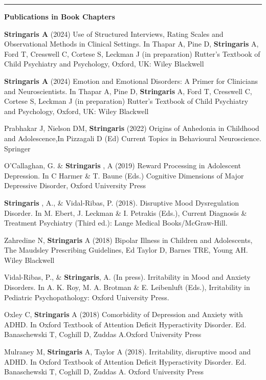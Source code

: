 \documentclass[
]{article}
\begin{document}
\begin{center}\rule{0.5\linewidth}{0.5pt}\end{center}

\textbf{Publications in Book Chapters}

\textbf{Stringaris A} (2024) Use of Structured Interviews, Rating Scales
and Observational Methods in Clinical Settings. In Thapar A, Pine D,
\textbf{Stringaris} A, Ford T, Cresswell C, Cortese S, Leckman J (in
preparation) Rutter's Textbook of Child Psychiatry and Psychology,
Oxford, UK: Wiley Blackwell

\textbf{Stringaris A} (2024) Emotion and Emotional Disorders: A Primer
for Clinicians and Neuroscientists. In Thapar A, Pine D,
\textbf{Stringaris} A, Ford T, Cresswell C, Cortese S, Leckman J (in
preparation) Rutter's Textbook of Child Psychiatry and Psychology,
Oxford, UK: Wiley Blackwell

Prabhakar J, Nielson DM, \textbf{Stringaris} (2022) Origins of Anhedonia
in Childhood and Adolescence,In Pizzagali D (Ed) Current Topics in
Behavioural Neuroscience. Springer

O'Callaghan, G. \& \textbf{Stringaris} , A (2019) Reward Processing in
Adolescent Depression. In C Harmer \& T. Baune (Eds.) Cognitive
Dimensions of Major Depressive Disorder, Oxford University Press

\textbf{Stringaris} , A., \& Vidal-Ribas, P. (2018). Disruptive Mood
Dysregulation Disorder. In M. Ebert, J. Leckman \& I. Petrakis (Eds.),
Current Diagnosis \& Treatment Psychiatry (Third ed.): Lange Medical
Books/McGraw-Hill.

Zahredine N, \textbf{Stringaris} A (2018) Bipolar Illness in Children
and Adolescents, The Maudsley Prescribing Guidelines, Ed Taylor D,
Barnes TRE, Young AH. Wiley Blackwell

Vidal-Ribas, P., \& \textbf{Stringaris}, A. (In press). Irritability in
Mood and Anxiety Disorders. In A. K. Roy, M. A. Brotman \& E. Leibenluft
(Eds.), Irritability in Pediatric Psychopathology: Oxford University
Press.

Oxley C, \textbf{Stringaris} A (2018) Comorbidity of Depression and
Anxiety with ADHD. In Oxford Textbook of Attention Deficit Hyperactivity
Disorder. Ed. Banaschewski T, Coghill D, Zuddas A.Oxford University
Press

Mulraney M, \textbf{Stringaris} A, Taylor A (2018). Irritability,
disruptive mood and ADHD. In Oxford Textbook of Attention Deficit
Hyperactivity Disorder. Ed. Banaschewski T, Coghill D, Zuddas A. Oxford
University Press
\end{document}
